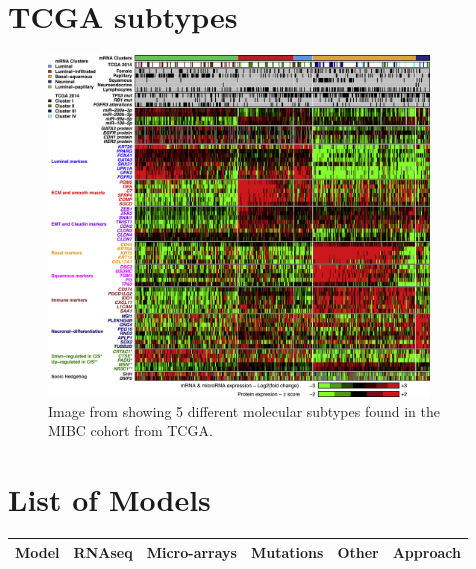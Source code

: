 \newpage

\begin{appendices}

\section{TCGA subtypes}


    
    \begin{figure}[!htb]    
        \centering
    \includegraphics[width=0.9\textwidth,height=0.9\textheight,keepaspectratio]{Sections/Lit_review/Resources/TCGA_2017_subtypes.jpg}
        \caption{Image from \cite{Robertson2017-mg} showing 5 different molecular subtypes found in the MIBC cohort from TCGA. }
        \label{fig:ap:tcga_subtypes}
    \end{figure}


\section{List of Models} \label{ap:tables_models}

\begin{small}
      \begin{longtable}[!h]{|p{2.0cm}|c|p{1.5cm}|c|p{2.2cm}|p{6.0cm}|} 
          \hline \multicolumn{1}{|c|}{\textbf{Model}} 
          & \multicolumn{1}{p{1.8cm}|}{\textbf{RNAseq}} 
          & \multicolumn{1}{p{1.5cm}|}{\textbf{Micro-arrays}} 
          & \multicolumn{1}{c|}{\textbf{Mutations}} 
          & \multicolumn{1}{c|}{\textbf{Other}}
          & \multicolumn{1}{c|}{\textbf{Approach}}  \\ \hline  \hline
          \endfirsthead
          

\end{longtable}
\end{small}
\end{appendices}
